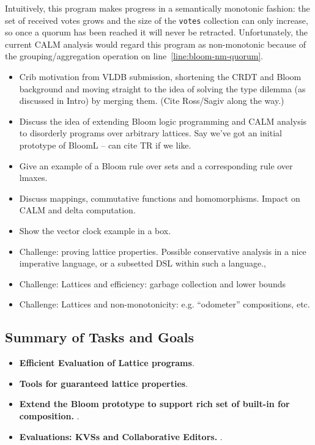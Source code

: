 Intuitively, this program makes progress in a semantically monotonic fashion:
the set of received votes grows and the size of the \texttt{votes} collection
can only increase, so once a quorum has been reached it will never be
retracted. Unfortunately, the current CALM analysis would regard this program as
non-monotonic because of the grouping/aggregation operation on
line~\ref{line:bloom-nm-quorum}.

\begin{itemize}
\item Crib motivation from VLDB submission, shortening the CRDT and Bloom background and moving straight to the idea of solving the type dilemma (as discussed in Intro) by merging them. (Cite Ross/Sagiv along the way.)
\item Discuss the idea of extending Bloom logic programming and CALM analysis to disorderly programs over arbitrary lattices. Say we've got an initial prototype of BloomL -- can cite TR if we like.
\item Give an example of a Bloom rule over sets and a corresponding rule over lmaxes.  
\item Discuss mappings, commutative functions and homomorphisms.  Impact on CALM and delta computation.
\item Show the vector clock example in a box.
\item Challenge: proving lattice properties. Possible conservative analysis in a nice imperative language, or a subsetted DSL within such a language., 
\item Challenge: Lattices and efficiency: garbage collection and lower bounds
\item Challenge: Lattices and non-monotonicity: e.g. ``odometer'' compositions, etc.
\end{itemize}

\subsection{Summary of Tasks and Goals}
\begin{itemize}
\item \textbf{Efficient Evaluation of Lattice programs}.  
\item \textbf{Tools for guaranteed lattice properties}.  
\item \textbf{Extend the Bloom prototype to support rich set of built-in for composition.}  .
\item \textbf{Evaluations: KVSs and Collaborative Editors.}  .
\end{itemize}